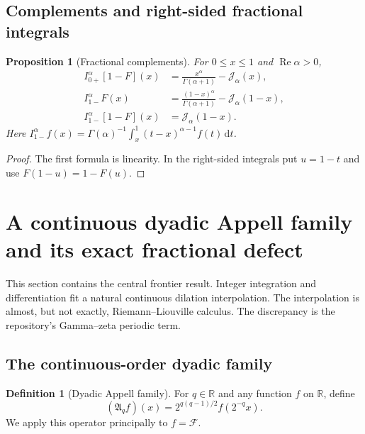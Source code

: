 \documentclass[11pt]{article}
\newtheorem{proposition}[theorem]{Proposition}
\theoremstyle{definition}
\newtheorem{definition}[theorem]{Definition}
\theoremstyle{remark}
\newcommand{\R}{\mathbb R}
\newcommand{\dd}{\,\mathrm d}
\newcommand{\Ree}{\operatorname{Re}}
\newcommand{\extF}{\mathcal F}
\newcommand{\Aop}{\mathfrak A}
\newcommand{\J}{\mathcal J}
\begin{document}
\subsection{Complements and right-sided fractional integrals}

\begin{proposition}[Fractional complements]
\label{prop:fractional-complements}
For $0\le x\le1$ and $\Ree\alpha>0$,
\begin{align}
 I_{0+}^{\alpha}[1-F](x)
 &=\frac{x^\alpha}{\Gamma(\alpha+1)}-\J_\alpha(x),
 \label{eq:fractional-complement-left}\\
 I_{1-}^{\alpha}F(x)
 &=\frac{(1-x)^\alpha}{\Gamma(\alpha+1)}-\J_\alpha(1-x),
 \label{eq:fractional-right-F}\\
 I_{1-}^{\alpha}[1-F](x)
 &=\J_\alpha(1-x).
 \label{eq:fractional-right-complement}
\end{align}
Here
$I_{1-}^{\alpha}f(x)=\Gamma(\alpha)^{-1}\int_x^1(t-x)^{\alpha-1}f(t)\dd t$.
\end{proposition}

\begin{proof}
The first formula is linearity.  In the right-sided integrals put $u=1-t$ and use
$F(1-u)=1-F(u)$.
\end{proof}

\section{A continuous dyadic Appell family and its exact fractional defect}
\label{sec:Appell}

This section contains the central frontier result.  Integer integration and differentiation
fit a natural continuous dilation interpolation.  The interpolation is almost, but not
exactly, Riemann--Liouville calculus.  The discrepancy is the repository's Gamma--zeta
periodic term.

\subsection{The continuous-order dyadic family}

\begin{definition}[Dyadic Appell family]
For $q\in\R$ and any function $f$ on $\R$, define
\begin{equation}
 (\Aop_q f)(x)=2^{q(q-1)/2}f(2^{-q}x).
 \label{eq:Appell-def}
\end{equation}
We apply this operator principally to $f=\extF$.
\end{definition}
\end{document}
